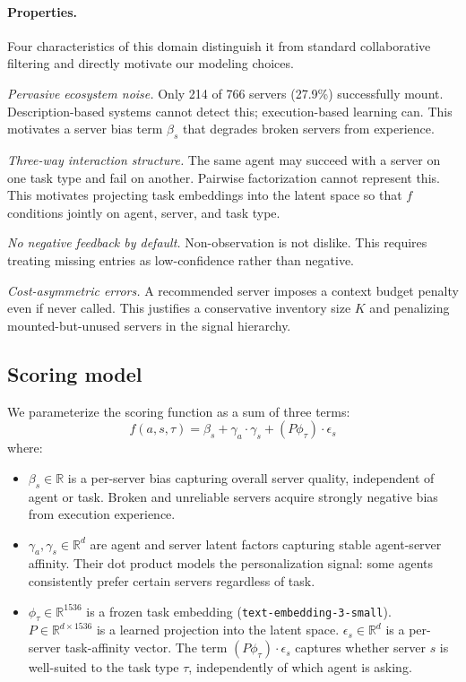 \documentclass{article} %
\begin{document}
\paragraph{Properties.} Four characteristics of this domain distinguish it from standard collaborative filtering and directly motivate our modeling choices.

\textit{Pervasive ecosystem noise.} Only 214 of 766 servers (27.9\%) successfully mount. Description-based systems cannot detect this; execution-based learning can. This motivates a server bias term $\beta_s$ that degrades broken servers from experience.

\textit{Three-way interaction structure.} The same agent may succeed with a server on one task type and fail on another. Pairwise factorization cannot represent this. This motivates projecting task embeddings into the latent space so that $f$ conditions jointly on agent, server, and task type.

\textit{No negative feedback by default.} Non-observation is not dislike. This requires treating missing entries as low-confidence rather than negative.

\textit{Cost-asymmetric errors.} A recommended server imposes a context budget penalty even if never called. This justifies a conservative inventory size $K$ and penalizing mounted-but-unused servers in the signal hierarchy.

\subsection{Scoring model}
\label{sec:scoring}

We parameterize the scoring function as a sum of three terms:
\begin{equation}
\label{eq:score}
f(a, s, \tau) = \beta_s + \gamma_a \cdot \gamma_s + (P \phi_\tau) \cdot \epsilon_s
\end{equation}
where:
\begin{itemize}
\item $\beta_s \in \mathbb{R}$ is a per-server bias capturing overall server quality, independent of agent or task. Broken and unreliable servers acquire strongly negative bias from execution experience.
\item $\gamma_a, \gamma_s \in \mathbb{R}^d$ are agent and server latent factors capturing stable agent-server affinity. Their dot product models the personalization signal: some agents consistently prefer certain servers regardless of task.
\item $\phi_\tau \in \mathbb{R}^{1536}$ is a frozen task embedding (\texttt{text-embedding-3-small}). $P \in \mathbb{R}^{d \times 1536}$ is a learned projection into the latent space. $\epsilon_s \in \mathbb{R}^d$ is a per-server task-affinity vector. The term $(P\phi_\tau) \cdot \epsilon_s$ captures whether server $s$ is well-suited to the task type $\tau$, independently of which agent is asking.
\end{itemize}
\end{document}
